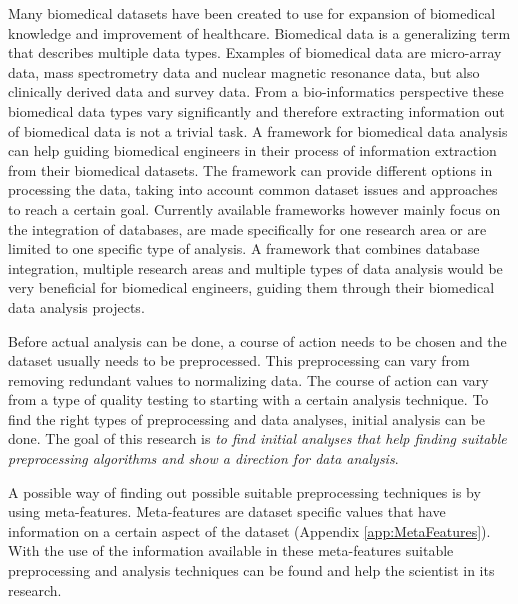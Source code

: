 \documentclass[10pt,a4paper]{article}
\begin{document}
	Many biomedical datasets have been created to use for expansion of biomedical knowledge and improvement of healthcare. Biomedical data is a generalizing term that describes multiple data types\cite{gehlenborg2010visualization}. Examples of biomedical data are micro-array data\cite{brazma2001minimum}, mass spectrometry data\cite{cottrell1999probability, dettmer2007mass} and nuclear magnetic resonance data\cite{capitani2017nuclear}, but also clinically derived data\cite{liu2012data, sittig2008grand} and survey data\cite{magni1990chronic}. From a bio-informatics perspective these biomedical data types vary significantly\cite{gehlenborg2010visualization} and therefore extracting information out of biomedical data is not a trivial task. A framework for biomedical data analysis can help guiding biomedical engineers in their process of information extraction from their biomedical datasets. The framework can provide different options in processing the data, taking into account common dataset issues\cite{bertolazzi2008logic, piatetsky2003microarray,lommen2009metalign} and approaches to reach a certain goal\cite{holzinger2014knowledge, wilkins2009proteomics}. Currently available frameworks however mainly focus on the integration of databases\cite{teodoro2009biomedical, doi:10.1093/nar/gkm1037}, are made specifically for one research area\cite{sturn2002genesis, karnovsky2011metscape, tabas2012genecodis3} or are limited to one specific type of analysis\cite{faul2007g}. A framework that combines database integration, multiple research areas and multiple types of data analysis would be very beneficial for biomedical engineers, guiding them through their biomedical data analysis projects.
	
	Before actual analysis can be done, a course of action needs to be chosen and the dataset usually needs to be preprocessed. This preprocessing can vary from removing redundant values to normalizing data. The course of action can vary from a type of quality testing to starting with a certain analysis technique. To find the right types of preprocessing and data analyses, initial analysis can be done. The goal of this research is \textit{to find initial analyses that help finding suitable preprocessing algorithms and show a direction for data analysis}.
	
	A possible way of finding out possible suitable preprocessing techniques is by using meta-features. Meta-features are dataset specific values that have information on a certain aspect of the dataset\cite{kluegl2009meta} (Appendix \ref{app:MetaFeatures}). With the use of the information available in these meta-features suitable preprocessing and analysis techniques can be found and help the scientist in its research.
	
\end{document}
